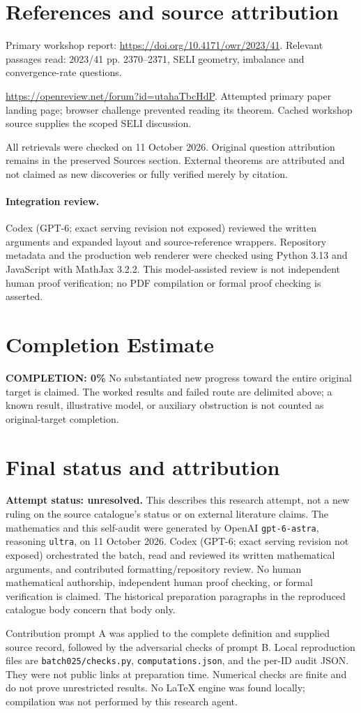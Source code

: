 \documentclass[11pt]{article}
\begin{document}
\section{References and source attribution}
Primary workshop report: \url{https://doi.org/10.4171/owr/2023/41}. Relevant passages read: 2023/41 pp. 2370--2371, SELI geometry, imbalance and convergence-rate questions.

\url{https://openreview.net/forum?id=utahaTbcHdP}. Attempted primary paper landing page; browser challenge prevented reading its theorem. Cached workshop source supplies the scoped SELI discussion.

All retrievals were checked on 11 October 2026. Original question attribution remains in the preserved Sources section. External theorems are attributed and not claimed as new discoveries or fully verified merely by citation.


\paragraph{Integration review.} Codex (GPT-6; exact serving revision not exposed) reviewed the written arguments and expanded layout and source-reference wrappers. Repository metadata and the production web renderer were checked using Python 3.13 and JavaScript with MathJax 3.2.2. This model-assisted review is not independent human proof verification; no PDF compilation or formal proof checking is asserted.

\section{Completion Estimate}
\noindent\textbf{COMPLETION: 0\%}
No substantiated new progress toward the entire original target is claimed. The worked results and failed route are delimited above; a known result, illustrative model, or auxiliary obstruction is not counted as original-target completion.

\section{Final status and attribution}
\textbf{Attempt status: unresolved.} This describes this research attempt, not a new ruling on the source catalogue's status or on external literature claims.
The mathematics and this self-audit were generated by OpenAI \texttt{gpt-6-astra}, reasoning \texttt{ultra}, on 11 October 2026. Codex (GPT-6; exact serving revision not exposed) orchestrated the batch, read and reviewed its written mathematical arguments, and contributed formatting/repository review. No human mathematical authorship, independent human proof checking, or formal verification is claimed. The historical preparation paragraphs in the reproduced catalogue body concern that body only.

Contribution prompt A was applied to the complete definition and supplied source record, followed by the adversarial checks of prompt B. Local reproduction files are \texttt{batch025/checks.py}, \texttt{computations.json}, and the per-ID audit JSON. They were not public links at preparation time. Numerical checks are finite and do not prove unrestricted results. No LaTeX engine was found locally; compilation was not performed by this research agent.
\end{document}
